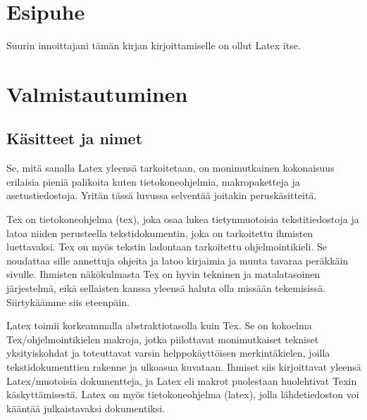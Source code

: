 \documentclass[a4paper,10pt,notitlepage,oneside]{book}
\newcommand{\koodi}[1]{\textsf{#1}}
\begin{document}
\pagestyle{empty}


{
  \renewcommand{\thispagestyle}[1]{}
}

\clearpage
\pagestyle{plain}

\chapter*{Esipuhe}

Suurin innoittajani tämän kirjan kirjoittamiselle on ollut Latex itse.


\chapter{Valmistautuminen}

\section{Käsitteet ja nimet}

Se, mitä sanalla Latex yleensä tarkoitetaan, on monimutkainen
kokonaisuus erilaisia pieniä palikoita kuten tietokone\-ohjelmia,
makropaketteja ja asetustiedostoja. Yritän tässä luvussa selventää
joitakin peruskäsitteitä.

Tex on tietokone\-ohjelma (\koodi{tex}), joka osaa lukea tietynmuotoisia
tekstitiedostoja ja latoa niiden perusteella tekstidokumentin, joka on
tarkoitettu ihmisten luettavaksi. Tex on myös tekstin ladontaan
tarkoitettu ohjelmointikieli. Se noudattaa sille annettuja ohjeita ja
latoo kirjaimia ja muuta tavaraa peräkkäin sivulle. Ihmisten
näkökulmasta Tex on hyvin tekninen ja matalatasoinen järjestelmä, eikä
sellaisten kanssa yleensä haluta olla missään tekemisissä. Siirtykäämme
siis eteenpäin.

Latex toimii korkeammalla abstraktiotasolla kuin Tex. Se on kokoelma
Tex\-/ohjelmointikielen makroja, jotka piilottavat monimutkaiset
tekniset yksityiskohdat ja toteuttavat varsin helppokäyttöisen
merkintäkielen, joilla tekstidokumenttien rakenne ja ulko\-asua
kuvataan. Ihmiset siis kirjoittavat yleensä Latex\-/muotoisia
dokumentteja, ja Latex eli makrot puolestaan huolehtivat Texin
käskyttämisestä. Latex on myös tietokone\-ohjelma (\koodi{latex}), jolla
lähdetiedoston voi kääntää julkaistavaksi dokumentiksi.
\end{document}
